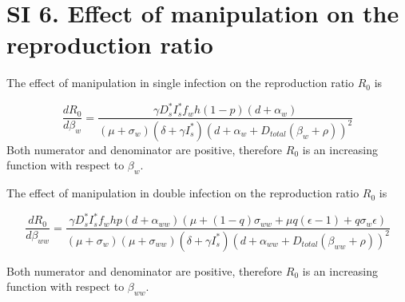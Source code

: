 \documentclass[11pt]{article}
\begin{document}
\section*{SI 6. Effect of manipulation on the reproduction ratio}

The effect of manipulation in single infection on the reproduction ratio $R_0$ is

\begin{equation}
	 \frac{d R_0}{d \beta_w} = \frac{\gamma  D_s^*  I_s^* f_w h  (1 - p) (d + \alpha_w)}{(\mu + \sigma_w) (\delta + \gamma  I_s^*) (d + \alpha_w + D_{total} (\beta_w + \rho ))^2}
\end{equation}
Both numerator and denominator are positive, therefore $R_0$ is an increasing function with respect to $\beta_{w}$.

The effect of manipulation in double infection on the reproduction ratio $R_0$ is

\begin{equation}
	\frac{d R_0}{d \beta_{ww}} = \frac{\gamma D_s^* I_s^* f_w h  p (d+ \alpha_{ww}) (\mu +(1 - q) \sigma_{ww} + \mu  q (\epsilon - 1) + q \sigma_w \epsilon )}{(\mu + \sigma_w) (\mu + \sigma_{ww}) (\delta + \gamma  I_s^*) (d + \alpha_{ww} + D_{total} (\beta_{ww} + \rho ))^2}
\end{equation}

Both numerator and denominator are positive, therefore $R_0$ is an increasing function with respect to $\beta_{ww}$.

\clearpage
\end{document}
